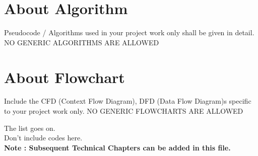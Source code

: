 \section{About Algorithm}
Pseudocode / Algorithms used in your project work only shall be given in detail. 
NO GENERIC ALGORITHMS ARE ALLOWED

\section{About Flowchart}
Include the CFD (Context Flow Diagram), DFD (Data Flow Diagram)s specific to your project work only. 
NO GENERIC FLOWCHARTS ARE ALLOWED

The list goes on.\\[2.0cm]
Don't include codes here.\\[2.0cm]
\textbf{{\large Note : Subsequent Technical Chapters can be added in this file.}}